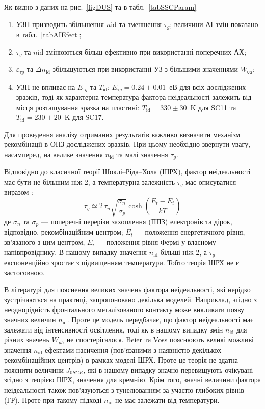Як видно з даних на рис.~\ref{figDUS} та в табл.~\ref{tabSSCParam}
\begin{enumerate}[label=\asbuk*),leftmargin=0em,itemindent=1.5em]
\item УЗН призводить збільшення $n\mathrm{id}$ та зменшення $\tau_{g}$;
   величини АІ змін показано в табл.~\ref{tabAIEfect};
\item $\tau_{g}$ та $n\mathrm{id}$ змінюються більш ефективно при використанні поперечних АХ;
\item $\varepsilon_{\tau g}$ та $\Delta n_\mathrm{id}$ збільшуються при використанні УЗ з більшими значеннями $W_{\mathtt{US}}$;
\item УЗН не впливає на $E_{\tau g}$ та $T_\mathrm{id}$;
 $E_{\tau g}=0.24\pm0.01$~еВ для всіх досліджених зразків,
 тоді як характерна температура фактора неідеальності залежить від місця розташування зразка на пластині: $T_\mathrm{id}=330\pm30$~K для SC11 та $T_\mathrm{id}=230\pm20$~K для SC17.
\end{enumerate}

Для проведення аналізу отриманих результатів важливо визначити механізм рекомбінації в ОПЗ досліджених зразків.
При цьому необхідно звернути увагу, насамперед, на велике значення  $n_{\mathrm{id}}$ та малі значення $\tau_g$.

Відповідно до класичної теорії Шоклі--Ріда--Хола (ШРХ),
фактор неідеальності має бути не більшим ніж 2, а температурна залежність $\tau_g$ має описуватися виразом \cite{TAUg:Schroder,TAUg:Aharoni}:
\begin{equation}
  \tau_g\simeq2\,\tau_n\sqrt{\frac{\sigma_n}{\sigma_p}}\cosh\left(\frac{E_t-E_i}{kT}\right)
\end{equation}
де
$\sigma_n$ та $\sigma_p$ --- поперечні перерізи захоплення (ППЗ) електронів та дірок, відповідно,
рекомбінаційним центром;
$E_t$ --- положення енергетичного рівня, зв'язаного з цим центром,
$E_i$  --- положення рівня Фермі у власному напівпровіднику.
В нашому випадку значення $n_{\mathrm{id}}$ більші ніж 2,
а $\tau_g$ експоненційно зростає з підвищенням температури.
Тобто теорія ШРХ не є застосовною.

В літературі для пояснення великих значень фактора неідеальності, які нерідко зустрічаються на практиці,
запропоновано декілька моделей.
Наприклад, згідно з \cite{Heide} неоднорідність фронтального металізованого контакту може викликати появу значних величин $n_\mathrm{id}$.
Проте це модель передбачає, що фактор неідеальності має залежати від інтенсивності освітлення, тоді як в нашому випадку змін $n_\mathrm{id}$ для різних
значень $W_{ph}$ не спостерігалося.
Beier та Voss \cite{Beier} пояснюють великі можливі значення $n_\mathrm{id}$ ефектами насичення (пов'язаними з наявністю декількох
рекомбінаційних центрів) в рамках моделі ШРХ.
Проте це теорія не здатна пояснити величини $J_{0SCR}$, які в нашому випадку значно перевищують очікувані згідно з теорією ШРХ, значення для кремнію.
Крім того, значні величини фактора неідеальності також пов'язуються з тунелюванням за участю глибоких рівнів (ГР)\cite{Shah,Kaminski_n}.
Проте при такому підході $n_\mathrm{id}$ не має залежати від температури.


